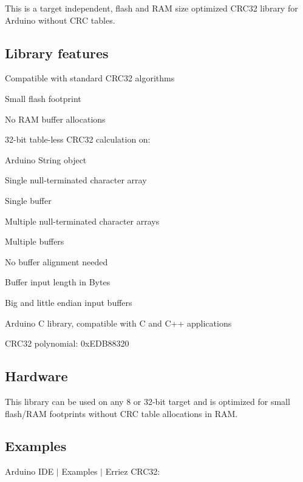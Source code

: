 \href{https://travis-ci.org/Erriez/ErriezCRC32}{\tt }

This is a target independent, flash and R\+AM size optimized C\+R\+C32 library for Arduino without C\+RC tables.



\subsection*{Library features}


\begin{DoxyItemize}
\item Compatible with standard C\+R\+C32 algorithms
\item Small flash footprint
\item No R\+AM buffer allocations
\item 32-\/bit table-\/less C\+R\+C32 calculation on\+:
\begin{DoxyItemize}
\item Arduino String object
\item Single null-\/terminated character array
\item Single buffer
\item Multiple null-\/terminated character arrays
\item Multiple buffers
\end{DoxyItemize}
\item No buffer alignment needed
\item Buffer input length in Bytes
\item Big and little endian input buffers
\item Arduino C library, compatible with C and C++ applications
\item C\+R\+C32 polynomial\+: 0x\+E\+D\+B88320
\end{DoxyItemize}

\subsection*{Hardware}

This library can be used on any 8 or 32-\/bit target and is optimized for small flash/\+R\+AM footprints without C\+RC table allocations in R\+AM.

\subsection*{Examples}

Arduino I\+DE $\vert$ Examples $\vert$ Erriez C\+R\+C32\+:



